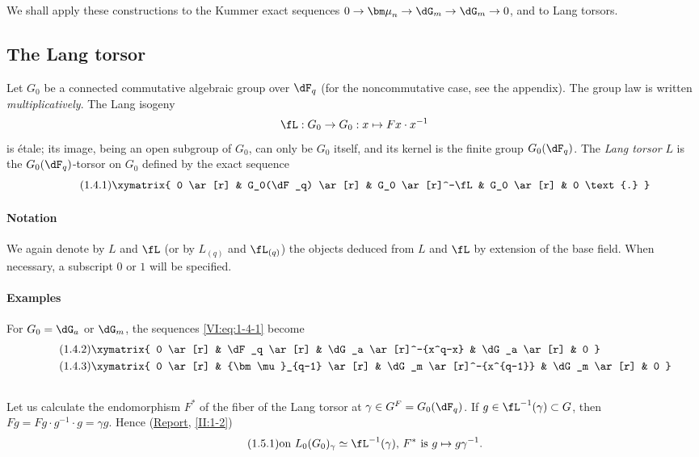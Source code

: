 \documentclass[12pt,oneside,english]{smfbook}
\newcommand{\dmu}{{\bm\mu}}
\begin{document}
We shall apply these constructions to the Kummer exact sequences $0\to\dmu_n\to\dG_m\to\dG_m\to0$, and to Lang torsors.

\subsection{The Lang torsor}\label{VI:1-4}

Let $G_0$ be a connected commutative algebraic group over $\dF_q$ (for the noncommutative case, see the appendix). The group law is written \emph{multiplicatively}. The Lang isogeny
\[
\fL:G_0 \to G_0: x\mapsto F x\cdot x^{-1}
\]
is étale; its image, being an open subgroup of $G_0$, can only be $G_0$ itself, and its kernel is the finite group $G_0(\dF_q)$. The \emph{Lang torsor} $L$ is the $G_0(\dF_q)$-torsor on $G_0$ defined by the exact sequence
\begin{equation*}\tag{1.4.1}\label{VI:eq:1-4-1}
\xymatrix{
  0 \ar[r]
    & G_0(\dF_q) \ar[r]
    & G_0 \ar[r]^-\fL
    & G_0 \ar[r]
    & 0 \text{.}
}
\end{equation*}

\paragraph{Notation}
We again denote by $L$ and $\fL$ (or by $L_{(q)}$ and $\fL_{(q)}$) the objects deduced from $L$ and $\fL$ by extension of the base field. When necessary, a subscript $0$ or $1$ will be specified.

\paragraph{Examples}
For $G_0=\dG_a$ or $\dG_m$, the sequences \eqref{VI:eq:1-4-1} become
\begin{align*}\tag{1.4.2}\label{VI:eq:1-4-2}
&\xymatrix{
  0 \ar[r]
    & \dF_q \ar[r]
    & \dG_a \ar[r]^-{x^q-x}
    & \dG_a \ar[r]
    & 0
} \\
\tag{1.4.3}\label{VI:eq:1-4-3}
&\xymatrix{
  0 \ar[r]
    & \dmu_{q-1} \ar[r]
    & \dG_m \ar[r]^-{x^{q-1}}
    & \dG_m \ar[r]
    & 0
}
\end{align*}

\subsection{}\label{VI:1-5}

Let us calculate the endomorphism $F^\ast$ of the fiber of the Lang torsor at $\gamma\in G^F=G_0(\dF_q)$. If $g\in\fL^{-1}(\gamma)\subset G$, then $Fg=Fg\cdot g^{-1}\cdot g=\gamma g$. Hence (\hyperref[II]{Report}, \ref{II:1-2})
\begin{equation*}\tag{1.5.1}\label{VI:eq:1-5-1}
  \text{on $L_0(G_0)_\gamma\simeq\fL^{-1}(\gamma)$,
  $F^\ast$ is $g\mapsto g\gamma^{-1}$.}
\end{equation*}
\end{document}

